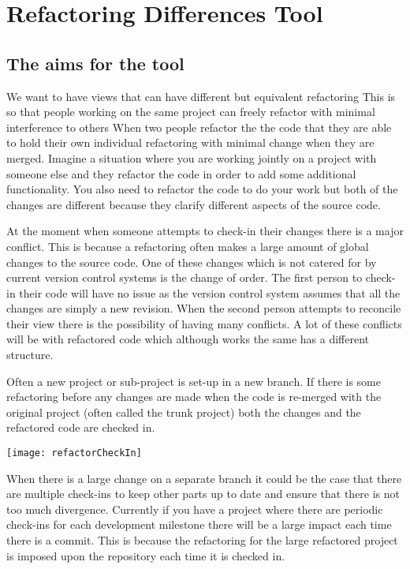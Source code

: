 
\chapter{Refactoring Differences Tool}
\section{The aims for the tool}
We want to have views that can have different but equivalent refactoring
This is so that people working on the same project can freely refactor with minimal interference to others
When two people refactor the the code that they are able to hold their own individual refactoring with minimal change when they are merged.
Imagine a situation where you are working jointly on a project with someone else and they refactor the code in order to add some additional functionality.  You also need to refactor the code to do your work but both of the changes are different because they clarify different aspects of the source code. 

At the moment when someone attempts to check-in their changes there is a major conflict.  This is because a refactoring often makes a large amount of global changes to the source code.  One of these changes which is not catered for by current version control systems is the change of order.  The first person to check-in their code will have no issue as the version control system assumes that all the changes are simply a new revision.  When the second person attempts to reconcile their view there is the possibility of having many conflicts.  A lot of these conflicts will be with refactored code which although works the same has a different structure.

Often a new project or sub-project is set-up in a new branch. If there is some refactoring before any changes are made when the code is re-merged with the original project (often called the trunk project) both the changes and the refactored code are checked in.

\begin{center}
\texttt{[image: refactorCheckIn]}
\end{center}

When there is a large change on a separate branch it could be the case that there are multiple check-ins to keep other parts up to date and ensure that there is not too much divergence.  Currently if you have a project where there are periodic check-ins for each development milestone there will be a large impact each time there is a commit. This is because the refactoring for the large refactored project is imposed upon the repository each time it is checked in.   

